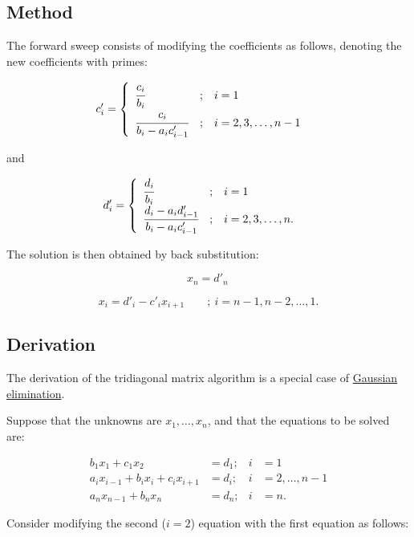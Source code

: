 \documentclass[]{article}
\begin{document}
\subsection{Method}\label{method}

The forward sweep consists of modifying the coefficients as follows,
denoting the new coefficients with primes:

\[c'_i =
\begin{cases}
\begin{array}{lcl}
  \cfrac{c_i}{b_i}                  & ; & i = 1 \\
  \cfrac{c_i}{b_i - a_i c'_{i - 1}} & ; & i = 2, 3, \dots, n-1 \\
\end{array}
\end{cases}
\,\]

and

\[d'_i =
\begin{cases}
\begin{array}{lcl}
  \cfrac{d_i}{b_i}                  & ; & i = 1 \\
  \cfrac{d_i - a_i d'_{i - 1}}{b_i - a_i c'_{i - 1}} & ; & i = 2, 3, \dots, n. \\
\end{array}
\end{cases}
\,\]

The solution is then obtained by back substitution:

\[x_n = d'_n\,\]

\[x_i = d'_i - c'_i x_{i + 1} \qquad ; \ i = n - 1, n - 2, \ldots, 1.\]

\subsection{Derivation}\label{derivation}

The derivation of the tridiagonal matrix algorithm is a special case of
\href{Gaussian_elimination}{Gaussian elimination}.

Suppose that the unknowns are \(x_1,\ldots, x_n\), and that the
equations to be solved are:

\[\begin{align}
b_1 x_1 + c_1 x_2 & = d_1;& i & = 1 \\
a_i x_{i - 1} + b_i x_i  + c_i x_{i + 1} & = d_i;& i & = 2, \ldots, n - 1 \\
a_n x_{n - 1} + b_n x_n & = d_n;& i & = n.
\end{align}\]

Consider modifying the second (\(i = 2\)) equation with the first
equation as follows:
\end{document}
